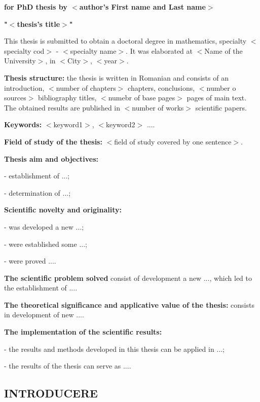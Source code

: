 \documentclass[a4paper, 12pt]{report}
\renewcommand{\baselinestretch}{1.5}
\begin{document}
{\renewcommand{\baselinestretch}{1.18}
\selectfont

\centerline{\bf for PhD thesis by $<$author's First name and Last name$>$}

\centerline{\bf "$<$thesis's title$>$"}

\vspace*{4mm}

This thesis is submitted to obtain a doctoral degree in mathematics, specialty $<$specialty cod$>$ - $<$specialty name$>$.
It was elaborated at $<$Name of the University$>$, in $<$City$>$, $<$year$>$.

{\bf Thesis structure:} the thesis is written in Romanian and consists of an introduction, $<$number of chapters$>$ chapters, conclusions, $<$number o sources$>$ bibliography titles, $<$numebr of base pages$>$ pages of main text. The obtained results are published in $<$number of works$>$ scientific papers.

{\bf Keywords:} $<$keyword1$>$, $<$keyword2$>$ .... 

{\bf Field of study of the thesis:} $<$field of study covered by one sentence$>$.

{\bf Thesis aim and objectives:} 

- establishment of ...;

- determination of ...;

{\bf Scientific novelty and originality:} 

- was developed a new ...;

- were established some ...;

- were proved ....

{\bf The scientific problem solved} consist of development a new ..., which led to the establishment of ....

{\bf The theoretical significance and applicative value of the thesis:} consists in development of new ....

{\bf The implementation of the scientific results:} 

- the results and methods developed in this thesis can be applied in ...;

- the results of the thesis can serve as ....

}

\newpage


\begin{center}
\section*{INTRODUCERE}
\end{center}
\end{document}
